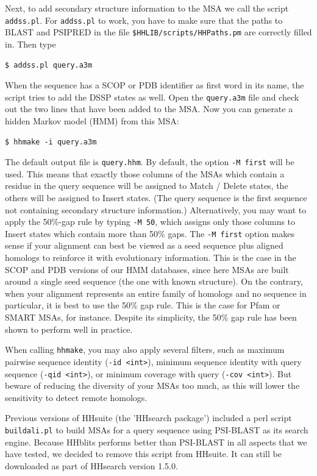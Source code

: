 \documentclass[11pt,a4paper]{article}
\begin{document}
Next, to add secondary structure information to the MSA we call the script \verb`addss.pl`. For \verb`addss.pl` to work, you have to make sure that the paths to BLAST and PSIPRED in the file \verb`$HHLIB/scripts/HHPaths.pm` are correctly filled in. Then type
\begin{verbatim}
$ addss.pl query.a3m
\end{verbatim}
When the sequence has a SCOP or PDB identifier as first word in its name, the script tries to add the DSSP states as well. Open the \verb`query.a3m` file and check out the two lines that have been added to the MSA. Now you can generate a hidden Markov model (HMM) from this MSA:
\begin{verbatim}
$ hhmake -i query.a3m
\end{verbatim}
The default output file is \verb`query.hhm`. By default, the option \verb`-M first` will 
be used. This means that exactly those columns of 
the MSAs which contain a residue in the query sequence will be assigned to Match 
/ Delete states, the others will be assigned to Insert states. (The query sequence is 
the first sequence not containing secondary structure information.) Alternatively, you 
may want to apply the 50\%-gap rule by typing \verb`-M 50`, which assigns only those columns 
to Insert states which contain more than 50\% gaps. The \verb`-M first` option makes sense 
if your alignment can best be viewed as a seed sequence plus aligned homologs to 
reinforce it with evolutionary information. This is the case in the SCOP and PDB 
versions of our HMM databases, since here MSAs are built around a single seed 
sequence (the one with known structure). On the contrary, when your alignment 
represents an entire family of homologs and no sequence in particular, it is best to 
use the 50\% gap rule. This is the case for Pfam or SMART MSAs, for instance. 
Despite its simplicity, the 50\% gap rule has been shown to perform well in practice.

When calling \verb`hhmake`, you may also apply several filters, such as maximum pairwise 
sequence identity (\verb`-id <int>`), minimum sequence identity with query sequence 
(\verb`-qid <int>`), or minimum coverage with query (\verb`-cov <int>`). But beware 
of reducing the diversity of your MSAs too much, as this will lower the sensitivity to
detect remote homologs.

Previous versions of HHsuite (the 'HHsearch package') included a perl script \verb`buildali.pl` to build MSAs for a query sequence using PSI-BLAST as its search engine. Because HHblits performs better than PSI-BLAST in all aspects that we have tested, we decided to remove this script from HHsuite. It can still be downloaded as part of HHsearch version 1.5.0.
\end{document}

